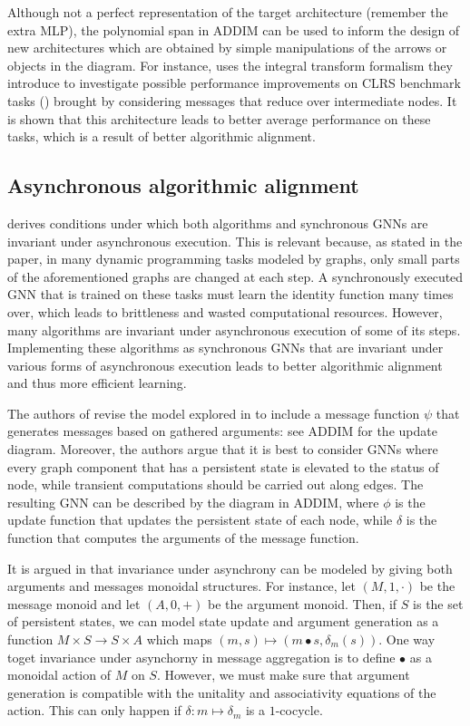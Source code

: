 \documentclass[11pt,a4paper,openright,twoside]{report}
\theoremstyle{plain}
\theoremstyle{definition}
\begin{document}
Although not a perfect representation of the target architecture (remember the extra MLP), the polynomial span in ADDIM can be used to inform the design of new architectures which are obtained by simple manipulations of the arrows or objects in the diagram. For instance, \cite{dudzik2022graph} uses the integral transform formalism they introduce to investigate possible performance improvements on CLRS benchmark tasks (\cite{velivckovic2022clrs}) brought by considering messages that reduce over intermediate nodes. It is shown that this architecture leads to better average performance on these tasks, which is a result of better algorithmic alignment.


\subsection{Asynchronous algorithmic alignment}

\cite{dudzik2024asynchronous} derives conditions under which both algorithms and synchronous GNNs are invariant under asynchronous execution. This is relevant because, as stated in the paper, in many dynamic programming tasks modeled by graphs, only small parts of the aforementioned graphs are changed at each step. A synchronously executed GNN that is trained on these tasks must learn the identity function many times over, which leads to brittleness and wasted computational resources. However, many algorithms are invariant under asynchronous execution of some of its steps. Implementing these algorithms as synchronous GNNs that are invariant under various forms of asynchronous execution leads to better algorithmic alignment and thus more efficient learning.

The authors of \cite{dudzik2024asynchronous} revise the model explored in \cite{dudzik2022graph} to include a message function $\psi$ that generates messages based on gathered arguments: see ADDIM for the update diagram. Moreover, the authors argue that it is best to consider GNNs where every graph component that has a persistent state is elevated to the status of node, while transient computations should be carried out along edges. The resulting GNN can be described by the diagram in ADDIM, where $\phi$ is the update function that updates the persistent state of each node, while $\delta$ is the function that computes the arguments of the message function.

It is argued in \cite{dudzik2024asynchronous} that invariance under asynchrony can be modeled by giving both arguments and messages monoidal structures. For instance, let $(M, 1, \cdot)$ be the message monoid and let $(A, 0, +)$ be the argument monoid. Then, if $S$ is the set of persistent states, we can model state update and argument generation as a function $M \times S \to S \times A$ which maps $(m,s) \mapsto (m \bullet s, \delta_m(s))$. One way toget invariance under asynchorny in message aggregation is to define $\bullet$ as a monoidal action of $M$ on $S$. However, we must make sure that argument generation is compatible with the unitality and associativity equations of the action. This can only happen if $\delta: m \mapsto \delta_m$ is a $1$-cocycle.
\end{document}
